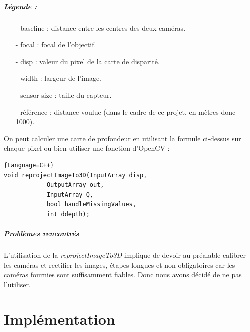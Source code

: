 \documentclass[12pt,a4paper]{report}
\begin{document}
\paragraph{Légende : }
\begin{small}
\begin{enumerate}
\item[-] baseline : distance entre les centres des deux caméras.\\
\item[-] focal : focal de l'objectif.\\
\item[-] disp : valeur du pixel de la carte de disparité.\\
\item[-] width : largeur de l'image.\\
\item[-] sensor size : taille du capteur.\\
\item[-] référence : distance voulue (dans le cadre de ce projet, en mètres donc 1000).\\
\end{enumerate}
\end{small}

On peut calculer une carte de profondeur en utilisant la formule ci-dessus sur chaque pixel ou bien utiliser une fonction d'OpenCV :  

\begin{lstlisting}{Language=C++}
void reprojectImageTo3D(InputArray disp, 
			OutputArray out, 
			InputArray Q, 
			bool handleMissingValues, 
			int ddepth);
\end{lstlisting}

\paragraph{Problèmes rencontrés}
L'utilisation de la \textit{reprojectImageTo3D} implique de devoir au préalable calibrer les caméras et rectifier les images, étapes longues et non obligatoires car les caméras fournies sont suffisamment fiables. Donc nous avons décidé de ne pas l'utiliser.

\chapter{Implémentation}
\end{document}
